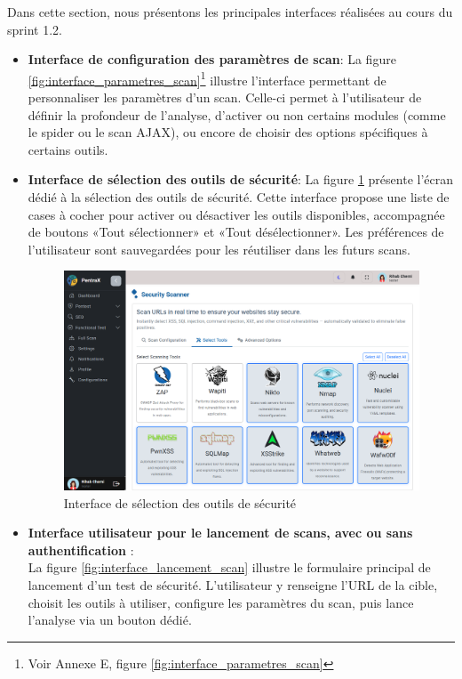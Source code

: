 Dans cette section, nous présentons les principales interfaces réalisées au cours du sprint 1.2. 
\begin{itemize}[label=$\bullet$]
    \item \textbf{Interface de configuration des paramètres de scan}:
    La figure \ref{fig:interface_parametres_scan}\footnote{Voir Annexe E, figure \ref{fig:interface_parametres_scan}} illustre l’interface permettant de personnaliser les paramètres d’un scan. Celle-ci permet à l’utilisateur de définir la profondeur de l’analyse, d’activer ou non certains modules (comme le spider ou le scan AJAX), ou encore de choisir des options spécifiques à certains outils.
    
    \item \textbf{Interface de sélection des outils de sécurité}:
    La figure \ref{fig:interface_selection_outils} présente l’écran dédié à la sélection des outils de sécurité. Cette interface propose une liste de cases à cocher pour activer ou désactiver les outils disponibles, accompagnée de boutons «Tout sélectionner» et «Tout désélectionner». Les préférences de l’utilisateur sont sauvegardées pour les réutiliser dans les futurs scans.
     \begin{figure}[H]
        \centering
        \includegraphics[width=\textwidth]{chapitres/ch3Sp1/section/sprint2/img/interface/tools.png}
        \caption{Interface de sélection des outils de sécurité}
        \label{fig:interface_selection_outils}
    \end{figure}
    \vspace{-0.2cm}
    \item \textbf{Interface utilisateur pour le lancement de scans, avec ou sans authentification} :\\
        La figure \ref{fig:interface_lancement_scan} illustre le formulaire principal de lancement d’un test de sécurité. L’utilisateur y renseigne l’URL de la cible, choisit les outils à utiliser, configure les paramètres du scan, puis lance l’analyse via un bouton dédié.


\end{itemize}
